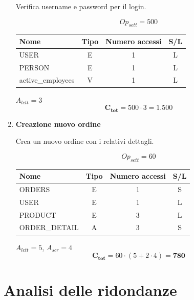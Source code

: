 \documentclass[a4paper,12pt]{report}
\begin{document}
\begin{enumerate}
    Verifica username e password per il login.
    
    $$Op_{sett} = 500$$
    
    \begin{table}[H]
        \centering
        \small
        \renewcommand{\arraystretch}{1.15}
        \begin{tabularx}{0.8\textwidth}{|X|c|c|c|}
            \hline
            \rowcolor{gray!20}
            \textbf{Nome} & \textbf{Tipo} & \textbf{Numero accessi} & \textbf{S/L} \\
            \hline
            USER & E & 1 & L \\
            PERSON & E & 1 & L \\
            active\_employees & V & 1 & L \\
            \hline
        \end{tabularx}
    \end{table}
    
    $A_{lett} = 3$
    $$\mathbf{C_{tot}} = 500 \cdot 3 = \mathbf{1.500}$$

    \item {\large \textbf{Creazione nuovo ordine}} \label{op20}
    
    Crea un nuovo ordine con i relativi dettagli.
    
    $$Op_{sett} = 60$$
    
    \begin{table}[H]
        \centering
        \small
        \renewcommand{\arraystretch}{1.15}
        \begin{tabularx}{0.8\textwidth}{|X|c|c|c|}
            \hline
            \rowcolor{gray!20}
            \textbf{Nome} & \textbf{Tipo} & \textbf{Numero accessi} & \textbf{S/L} \\
            \hline
            ORDERS & E & 1 & S \\
            USER & E & 1 & L \\
            PRODUCT & E & 3 & L \\
            ORDER\_DETAIL & A & 3 & S \\
            \hline
        \end{tabularx}
    \end{table}
    
    $A_{lett} = 5$, $A_{scr} = 4$
    $$\mathbf{C_{tot}} = 60 \cdot (5 + 2 \cdot 4) = \mathbf{780}$$
\end{enumerate}

\section{Analisi delle ridondanze}
\end{document}

